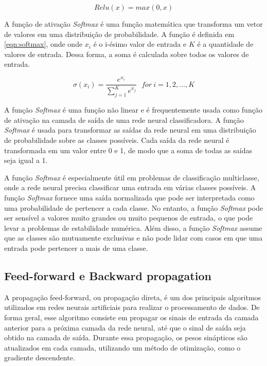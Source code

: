 \begin{equation}
\label{eqn:relu}
Relu(x) = max(0, x)
\end{equation}

A função de ativação \textit{Softmax} é uma função matemática que transforma um vetor de valores em uma distribuição de probabilidade. 
A função é definida em \autoref{eqn:softmax}, onde onde $x_{i}$ é o i-ésimo valor de entrada e $K$ é a quantidade de valores de entrada.
Dessa forma, a soma é calculada sobre todos os valores de entrada.

\begin{equation}
\label{eqn:softmax}
\sigma(x_i) = \frac{e^{x_{i}}}{\sum_{j=1}^K e^{x_{j}}} \ \ \ for\ i=1,2,\dots,K
\end{equation}

A função \textit{Softmax} é uma função não linear e é frequentemente usada como função de ativação na camada de saída de uma rede neural classificadora. 
A função \textit{Softmax} é usada para transformar as saídas da rede neural em uma distribuição de probabilidade sobre as classes possíveis. 
Cada saída da rede neural é transformada em um valor entre 0 e 1, de modo que a soma de todas as saídas seja igual a 1.

A função \textit{Softmax} é especialmente útil em problemas de classificação multiclasse, onde a rede neural precisa classificar uma entrada em várias classes possíveis. 
A função \textit{Softmax} fornece uma saída normalizada que pode ser interpretada como uma probabilidade de pertencer a cada classe.
No entanto, a função \textit{Softmax} pode ser sensível a valores muito grandes ou muito pequenos de entrada, o que pode levar a problemas de estabilidade numérica. 
Além disso, a função \textit{Softmax} assume que as classes são mutuamente exclusivas e não pode lidar com casos em que uma entrada pode pertencer a mais de uma classe.


\subsection{Feed-forward e Backward propagation}

A propagação feed-forward, ou propagação direta, é um dos principais algoritmos utilizados em redes neurais artificiais para realizar o processamento de dados. 
De forma geral, esse algoritmo consiste em propagar os sinais de entrada da camada anterior para a próxima camada da rede neural, até que o sinal de saída seja obtido na camada de saída. 
Durante essa propagação, os pesos sinápticos são atualizados em cada camada, utilizando um método de otimização, como o gradiente descendente.

